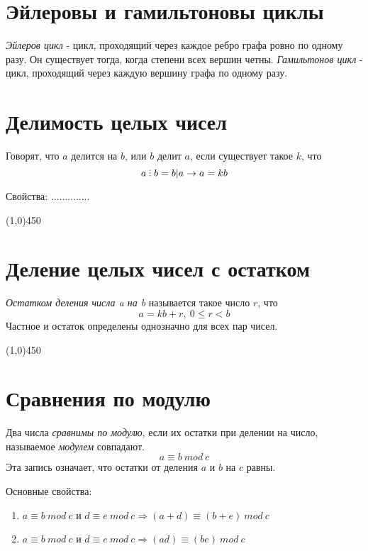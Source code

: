 \documentclass[a4paper,12pt]{article}
\newcommand{\divby}{\ \tikz \foreach \y in {0ex, 0.65ex, 1.3ex} \fill (0,\y) circle (0.5pt);\ }
\begin{document}
	\section*{Эйлеровы и гамильтоновы циклы}
	\textit{Эйлеров цикл} - цикл, проходящий через каждое ребро графа ровно по одному разу. Он существует тогда, когда степени всех вершин четны.
	\textit{Гамильтонов цикл} - цикл, проходящий через каждую вершину графа по одному разу.

	\section*{Делимость целых чисел}
	Говорят, что $a$ делится на $b$, или $b$ делит $a$, если существует такое $k$, что
	\[
	a \divby b = b | a \rightarrow a = kb
	\]

	Свойства: ..............

	\begin{center}
		\line(1,0){450}
	\end{center}

	\section*{Деление целых чисел с остатком}
	\textit{Остатком деления числа a на b} называется такое число $r$, что
	\[
	a = kb + r, \ 0 \leq r < b
	\]
	Частное и остаток определены однозначно для всех пар чисел.

	\begin{center}
		\line(1,0){450}
	\end{center}

	\section*{Сравнения по модулю}
	Два числа \textit{сравнимы по модулю}, если их остатки при делении на число, называемое \textit{модулем} совпадают.
	\[
	a \equiv b \ mod \ c
	\]
	Эта запись означает, что остатки от деления $a$ и $b$ на $c$ равны.

	Основные свойства:
	\begin{enumerate}
		\item $a \equiv b \ mod \ c$ и $d \equiv e \ mod \ c \Rightarrow (a + d) \equiv (b + e) \ mod \ c$
		\item $a \equiv b \ mod \ c$ и $d \equiv e \ mod \ c \Rightarrow (ad) \equiv (be) \ mod \ c$

	\end{enumerate}
\end{document}
